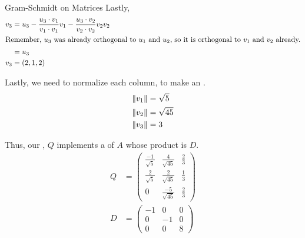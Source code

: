 \begin{example}{Gram-Schmidt on Matrices}
  Lastly,
  \begin{align*}
    v_{3} &= u_{3} - \frac{u_{3} \cdot v_{1}}{v_{1} \cdot v_{1}} v_{1} - \frac{u_{3} \cdot v_{2}}{v_{2} \cdot v_{2}} v_{2} v_{2} \\
    \intertext{Remember, $u_{3}$ was already orthogonal to $u_{1}$ and $u_{2}$, so it is orthogonal to $v_{1}$ and $v_{2}$ already.}
          &= u_{3} \\
    v_{3} &= (2, 1, 2)
  \end{align*}

  Lastly, we need to normalize each column, to make an .
  \begin{align*}
    \lVert v_{1} \rVert &= \sqrt{5} \\
    \lVert v_{2} \rVert &= \sqrt{45} \\
    \lVert v_{3} \rVert &= 3
  \end{align*}

  Thus, our , $Q$ implements a  of $A$ whose product is $D$.
  \begin{align*}
    Q &=
        \begin{pmatrix}
          \frac{-1}{\sqrt{5}} & \frac{4}{\sqrt{45}} & \frac{2}{3} \\
          \frac{2}{\sqrt{5}} & \frac{2}{\sqrt{45}} & \frac{1}{3} \\
          0 & \frac{-5}{\sqrt{45}} & \frac{2}{3}
        \end{pmatrix} \\
    D &=
        \begin{pmatrix}
          -1 & 0 & 0 \\
          0 & -1 & 0 \\
          0 & 0 & 8
        \end{pmatrix}
  \end{align*}
\end{example}


